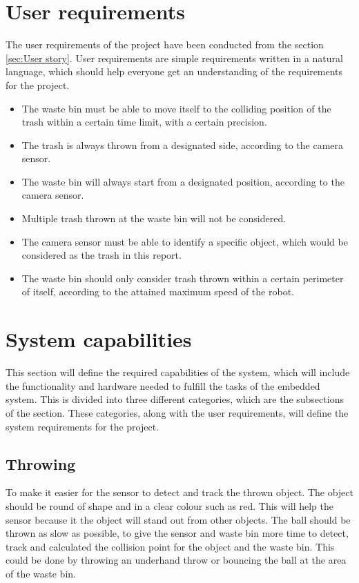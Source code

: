 \section{User requirements}
\label{sec:User requirements}
The user requirements of the project have been conducted from the section \ref{sec:User story}. User requirements are simple requirements written in a natural language, which should help everyone get an understanding of the requirements for the project.

\begin{itemize}
\item The waste bin must be able to move itself to the colliding position of the trash within a certain time limit, with a certain precision.
\item The trash is always thrown from a designated side, according to the camera sensor.
\item The waste bin will always start from a designated position, according to the camera sensor.
\item Multiple trash thrown at the waste bin will not be considered.
\item The camera sensor must be able to identify a specific object, which would be considered as the trash in this report.
\item The waste bin should only consider trash thrown within a certain perimeter of itself, according to the attained maximum speed of the robot.
\end{itemize}

\section{System capabilities}
\label{sec:System capabilities}
This section will define the required capabilities of the system, which will include the functionality and hardware needed to fulfill the tasks of the embedded system. This is divided into three different categories, which are the subsections of the section. These categories, along with the user requirements, will define the system requirements for the project.

\subsection{Throwing}
\label{sec:ThrowingAnalysis}
To make it easier for the sensor to detect and track the thrown object. The object should be round of shape and in a clear colour such as red. This will help the sensor because it the object will stand out from other objects. \newline
The ball should be thrown as slow as possible, to give the sensor and waste bin more time to detect, track and calculated the collision point for the object and the waste bin. This could be done by throwing an underhand throw or bouncing the ball at the area of the waste bin.

